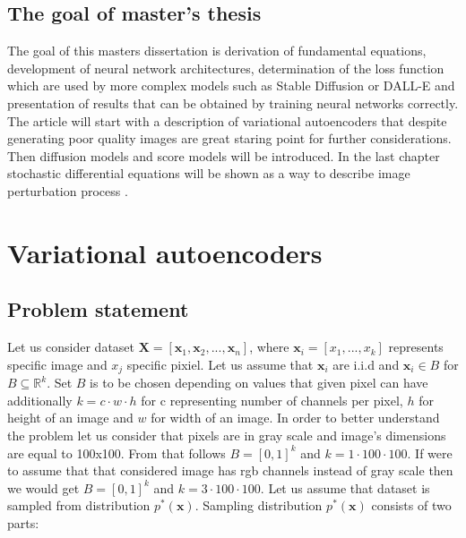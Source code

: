 \documentclass[10pt]{article}
\begin{document}
\subsection{The goal of master's thesis }

The goal of this masters dissertation is derivation of fundamental equations, development of neural network architectures, determination of the loss function which are used by more complex models such as  Stable Diffusion\cite{stable_diff} or DALL-E \cite{dalle_3} and presentation of results that can be obtained by training neural networks correctly. The article will start with a description of variational autoencoders \cite{wprowadzenie} \cite{var_bayes} \cite{VQ-VAE} \cite{Ladder_models} \cite{how_to_train} that despite generating poor quality images are great staring point for further considerations. Then diffusion models \cite{ddm} \cite{additional_explanation}  and score models \cite{score_model} \cite{improved_score} \cite{denoising_score} \cite{score_model_begin} \cite{score_model_blog} will be introduced. In the last chapter stochastic differential equations will be shown as a way to describe image perturbation process \cite{score_sde} \cite{score_model_blog}.

\section{Variational autoencoders}
\subsection{Problem statement}
Let us consider dataset $\textbf{X} = [\textbf{x}_{1} , \textbf{x}_{2}, ... ,\textbf{x}_{n}]$, where $\textbf{x}_{i} = [x_1, ..., x_k]$ represents specific image and $x_j$ specific pixiel. Let us assume that  $\textbf{x}_{i}$ are i.i.d and  $\textbf{x}_{i} \in B$ for $B \subseteq \mathbb{R}^k$. Set $B$ is to be chosen depending on values that given pixel can have additionally $k = c \cdot w \cdot h$ for  c representing number of channels per pixel, $h$ for height of an image and $w$ for width of an image. In order to better understand the problem let us consider that pixels are in gray scale and image's dimensions are equal to 100x100. From that follows $B=[0,1]^k$ and $k = 1 \cdot 100 \cdot 100$. If were to assume that  that considered image has rgb channels instead of gray scale then we would get $B=[0,1]^k$ and $k = 3 \cdot 100 \cdot 100$. Let us assume that dataset is sampled from distribution $p^{*}(\textbf{x})$. Sampling distribution  $p^{*}(\textbf{x})$ consists of two parts:
\end{document}
